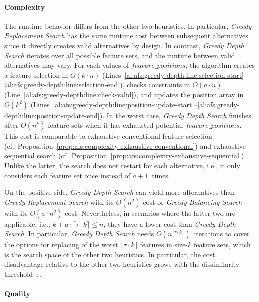 \documentclass{article}
\theoremstyle{definition}
\begin{document}
\paragraph{Complexity}

The runtime behavior differs from the other two heuristics.
In particular, \emph{Greedy Replacement Search} has the same runtime cost between subsequent alternatives since it directly creates valid alternatives by design.
In contrast, \emph{Greedy Depth Search} iterates over all possible feature sets, and the runtime between valid alternatives may vary.
For each values of $feature\_positions$, the algorithm creates a feature selection in $O(k \cdot n)$ (Lines~\ref{al:afs:greedy-depth:line:selection-start}--\ref{al:afs:greedy-depth:line:selection-end}), checks constraints in $O(a \cdot n)$ (Line~\ref{al:afs:greedy-depth:line:check-valid}), and updates the position array in~$O(k^2)$ (Lines~\ref{al:afs:greedy-depth:line:position-update-start}--\ref{al:afs:greedy-depth:line:position-update-end}).
In the worst case, \emph{Greedy Depth Search} finishes after $O(n^k)$ feature sets when it has exhausted potential $feature\_positions$.
This cost is comparable to exhaustive conventional feature selection (cf.~Proposition~\ref{prop:afs:complexity-exhaustive-conventional}) and exhaustive sequential search (cf.~Proposition~\ref{prop:afs:complexity-exhaustive-sequential}).
Unlike the latter, the search does not restart for each alternative, i.e., it only considers each feature set once instead of $a+1$~times.

On the positive side, \emph{Greedy Depth Search} can yield more alternatives than \emph{Greedy Replacement Search} with its $O(n^2)$ cost or \emph{Greedy Balancing Search} with its $O(a \cdot n^2)$ cost.
Nevertheless, in scenarios where the latter two are applicable, i.e., $k + a \cdot \lceil \tau \cdot k \rceil \leq n$, they have a lower cost than \emph{Greedy Depth Search}.
In particular, \emph{Greedy Depth Search} needs $O(n^{\lceil \tau \cdot k \rceil})$~iterations to cover the options for replacing of the worst $\lceil \tau \cdot k \rceil$ features in size-$k$ feature sets, which is the search space of the other two heuristics.
In particular, the cost disadvantage relative to the other two heuristics grows with the dissimilarity threshold~$\tau$.

\paragraph{Quality}
\end{document}
